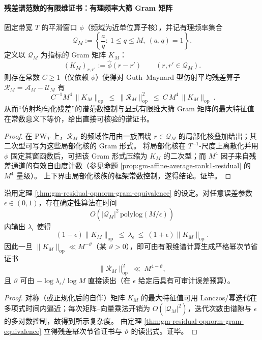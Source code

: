 \paragraph{残差谱范数的有限维证书：有理频率大筛 Gram 矩阵}
\begin{theorem}\label{thm:gm-residual-opnorm-gram-equivalence}
固定带宽 \(T\) 的平滑窗口 \(\phi\)（频域为近单位算子核），并记有理频率集合
\[
\mathcal{Q}_M:=\left\{\frac{a}{q}:\ 1\le q\le M,\ (a,q)=1\right\}.
\]
定义以 \(\mathcal{Q}_M\) 为指标的 Gram 矩阵 \(K_M\)：
\[
(K_M)_{r,r'}:=\widehat{\phi}(r-r')\qquad (r,r'\in\mathcal{Q}_M).
\]
则存在常数 \(C\ge 1\)（仅依赖 \(\phi\)）使得对 Guth--Maynard 型仿射平均残差算子 \(\mathcal{R}_M=\mathcal{A}_M-\mathcal{U}_M\) 有
\[
\boxed{\ 
C^{-1}M^4\,\|K_M\|_{\mathrm{op}}
\ \le\
\|\mathcal{R}_M\|_{\mathrm{op}}^2
\ \le\
C\,M^4\,\|K_M\|_{\mathrm{op}}
\ }.
\]
从而“仿射均匀化残差”的谱范数控制与显式有限维大筛 Gram 矩阵的最大特征值在常数意义下等价，给出直接可核验的谱证书。
\end{theorem}

\begin{proof}
在 \(\mathrm{PW}_T\) 上，\(\mathcal{R}_M\) 的频域作用由一族围绕 \(r\in\mathcal{Q}_M\) 的局部化核叠加给出；其二次型可写为这些局部化核的 Gram 形式。
将局部化核在 \(T^{-1}\)-尺度上离散化并用 \(\phi\) 固定其窗函数后，可把该 Gram 形式压缩为 \(K_M\) 的二次型；而 \(M^4\) 因子来自残差通道的有效自由度计数（参见命题 \ref{prop:gm-affine-average-rank1-residual} 的 \(M^4\) 量级）。
上下界由局部化核族的框架常数控制，遂得结论。证毕。
\end{proof}

\begin{corollary}\label{cor:gm-KM-computable-vtheta}
沿用定理 \ref{thm:gm-residual-opnorm-gram-equivalence} 的设定。对任意误差参数 \(\epsilon\in(0,1)\)，存在确定性算法在时间
\[
O\!\left(|\mathcal{Q}_M|^{2}\,\mathrm{polylog}(M/\epsilon)\right)
\]
内输出 \(\lambda_\epsilon\) 使得
\[
(1-\epsilon)\|K_M\|_{\mathrm{op}}\ \le\ \lambda_\epsilon\ \le\ (1+\epsilon)\|K_M\|_{\mathrm{op}}.
\]
因此一旦 \(\|K_M\|_{\mathrm{op}}\ll M^{-\vartheta}\)（某 \(\vartheta>0\)），即可由有限维谱计算生成严格幂次节省证书
\[
\|\mathcal{R}_M\|_{\mathrm{op}}^2\ \ll\ M^{4-\vartheta},
\]
且 \(\vartheta\) 可由 \(-\log\lambda_\epsilon/\log M\) 直接读出（在 \(\epsilon\) 给定后具有可审计误差预算）。
\end{corollary}

\begin{proof}
对称（或正规化后的自伴）矩阵 \(K_M\) 的最大特征值可用 Lanczos/幂迭代在多项式时间内逼近；每次矩阵--向量乘法开销为 \(O(|\mathcal{Q}_M|^2)\)，迭代次数由谱隙与 \(\epsilon\) 的多对数控制，故得到所示复杂度。
由定理 \ref{thm:gm-residual-opnorm-gram-equivalence} 立得残差幂次节省证书与 \(\vartheta\) 的读出式。证毕。
\end{proof}

